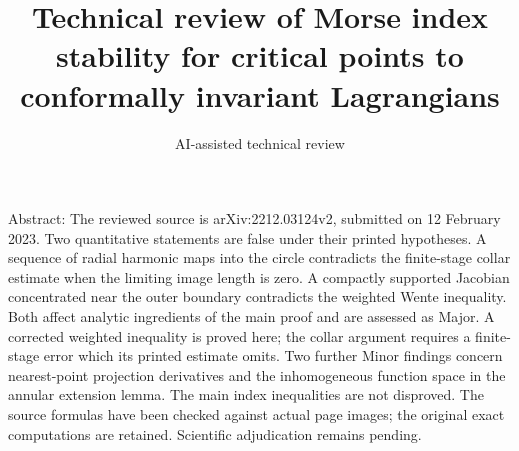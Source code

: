 \documentclass[10pt]{article}
\title{Technical review of
Morse index stability for critical points
to conformally invariant Lagrangians}
\author{AI-assisted technical review}
\date{}
\begin{document}
\maketitle
Abstract: The reviewed source is arXiv:2212.03124v2, submitted on 12 February 2023. Two quantitative statements are false under their printed hypotheses. A sequence of radial harmonic maps into the circle contradicts the finite-stage collar estimate when the limiting image length is zero. A compactly supported Jacobian concentrated near the outer boundary contradicts the weighted Wente inequality. Both affect analytic ingredients of the main proof and are assessed as Major. A corrected weighted inequality is proved here; the collar argument requires a finite-stage error which its printed estimate omits. Two further Minor findings concern nearest-point projection derivatives and the inhomogeneous function space in the annular extension lemma. The main index inequalities are not disproved. The source formulas have been checked against actual page images; the original exact computations are retained. Scientific adjudication remains pending.\par
\end{document}

